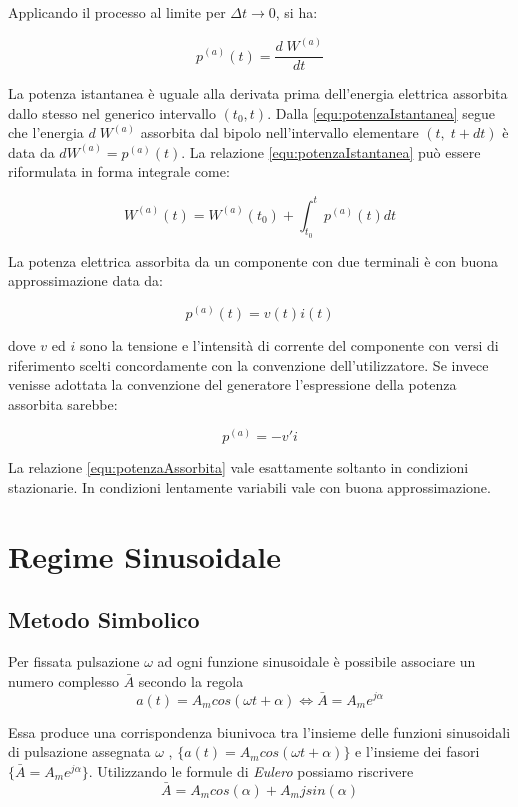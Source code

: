 \documentclass[a4paper]{report}
\begin{document}
Applicando il processo al limite per $\Delta t \rightarrow 0$, si ha:

\begin{equation}\label{equ:potenzaIstantanea}
p^{(a)}(t)=\dfrac{d\;W^{(a)}}{dt}
\end{equation}

La potenza istantanea \`e uguale alla derivata prima dell'energia
elettrica assorbita dallo stesso nel generico intervallo 
$(t_0,t)$. Dalla \ref{equ:potenzaIstantanea} segue che l'energia $d\;
W^{(a)}$ assorbita dal bipolo nell'intervallo elementare $(t,\;
t+dt)$ \`e data da $dW^{(a)}=p^{(a)}(t)$. La relazione
\ref{equ:potenzaIstantanea} pu\`o essere riformulata in forma integrale come:

\[
W^{(a)}(t)=W^{(a)}(t_0)+\int_{t_0}^{t}p^{(a)}(t)dt
\]

La potenza elettrica assorbita da un componente con due terminali \`e
con buona approssimazione data da:

\begin{equation}\label{equ:potenzaAssorbita}
p^{(a)}(t)=v(t)i(t)
\end{equation}

dove $v$ ed $i$ sono la tensione e l'intensit\`a di corrente del
componente con versi di riferimento scelti concordamente con la
convenzione dell'utilizzatore. Se invece venisse adottata la
convenzione del generatore l'espressione della potenza assorbita
sarebbe:

\[
p^{(a)}=-v'i
\]

La relazione \ref{equ:potenzaAssorbita} vale esattamente soltanto in
condizioni stazionarie. In condizioni lentamente variabili vale con
buona approssimazione.

\chapter{Regime Sinusoidale}
\section{Metodo Simbolico}
Per fissata pulsazione $\omega$ ad ogni funzione sinusoidale \`e
possibile associare un numero complesso $\bar{A}$ secondo la regola
\[
a(t) = A_mcos(\omega t+\alpha)\iff \bar{A} = A_me^{j\alpha}
\]

Essa produce una corrispondenza biunivoca tra l'insieme delle funzioni
sinusoidali di pulsazione assegnata $\omega$ , $\{
a(t)=A_mcos(\omega t+\alpha )\}$ e l'insieme dei fasori $\{ \bar{A} =
A_me^{j\alpha} \}$.
Utilizzando le formule di \emph{Eulero} possiamo riscrivere
\[
\bar{A} = A_mcos(\alpha)+ A_mjsin(\alpha)
\]
\end{document}
